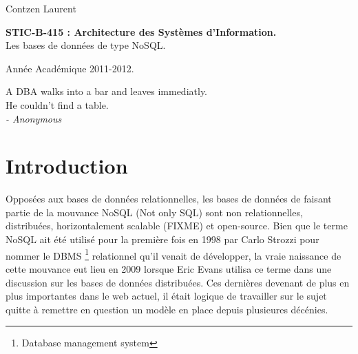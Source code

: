 \documentclass[11pt]{article}
\author{Contzen Laurent}
\begin{document}
\begin{titlepage}  
  \begin{flushleft}
    Contzen Laurent
  \end{flushleft}
  \begin{center}
    \vspace{85mm}\LARGE{\textbf{STIC-B-415 : Architecture des Systèmes d'Information.} \\    
      Les bases de données de type NoSQL.}
  \end{center}
  \begin{flushright}
    \vspace{95mm}
    Année Académique 2011-2012.             
  \end{flushright}
\end{titlepage}

\tableofcontents
\newpage
\vspace*{\fill}
\begin{flushright}
  A DBA walks into a bar and leaves immediatly. \\
  He couldn't find a table. \\
  \textit{- Anonymous}
\end{flushright}
\vspace*{\fill}
\newpage

\section{Introduction}
Opposées aux bases de données relationnelles, les bases de données de faisant partie de la mouvance NoSQL (Not only SQL) sont non relationnelles, distribuées, horizontalement scalable (FIXME) et open-source. Bien que le terme NoSQL ait été utilisé pour la première fois en 1998 par Carlo Strozzi pour nommer le DBMS \footnote{Database management system} relationnel qu'il venait de développer, la vraie naissance de cette mouvance eut lieu en 2009 lorsque Eric Evans utilisa ce terme dans une discussion sur les bases de données distribuées. Ces dernières devenant de plus en plus importantes dans le web actuel, il était logique de travailler sur le sujet quitte à remettre en question un modèle en place depuis plusieures décénies.
\end{document}
